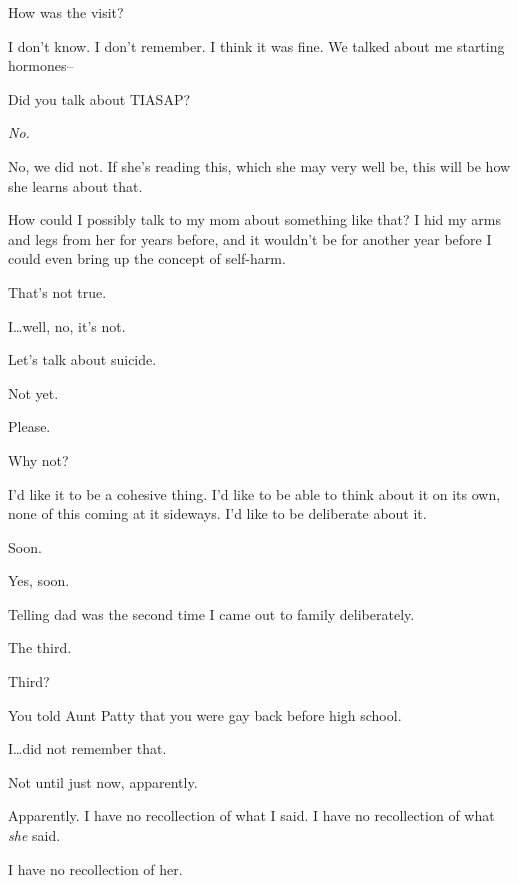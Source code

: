 \begin{paracol}{2}
\begin{leftcolumn}
\begin{ally}
How was the visit?
\end{ally}
I don't know. I don't remember. I think it was fine. We talked about me starting hormones--

\begin{ally}
Did you talk about TIASAP?
\end{ally}
\emph{No.}

No, we did not. If she's reading this, which she may very well be, this will be how she learns about that.

How could I possibly talk to my mom about something like that? I hid my arms and legs from her for years before, and it wouldn't be for another year before I could even bring up the concept of self-harm.

\begin{ally}
That's not true.
\end{ally}
I\ldots{}well, no, it's not.

\begin{ally}
Let's talk about suicide.
\end{ally}
Not yet.

Please.

\begin{ally}
Why not?
\end{ally}
I'd like it to be a cohesive thing. I'd like to be able to think about it on its own, none of this coming at it sideways. I'd like to be deliberate about it.

\begin{ally}
Soon.
\end{ally}
Yes, soon.
\newpage

\noindent Telling dad was the second time I came out to family deliberately.

\begin{ally}
The third.
\end{ally}
Third?

\begin{ally}
You told Aunt Patty that you were gay back before high school.
\end{ally}
I\ldots{}did not remember that.

\begin{ally}
Not until just now, apparently.
\end{ally}
Apparently. I have no recollection of what I said. I have no recollection of what \emph{she} said.

I have no recollection of her.


\end{leftcolumn}
\end{paracol}
